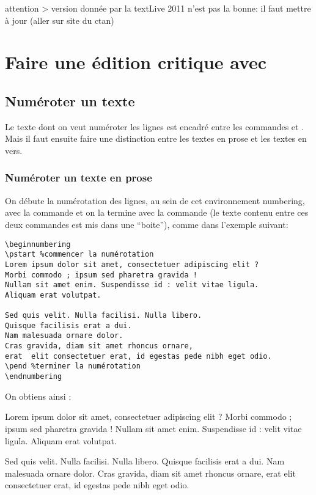 

attention > version donnée par la textLive 2011 n'est pas la bonne: il faut mettre à jour  (aller sur site du ctan)

\section{Faire une édition critique avec }

\subsection{Numéroter un texte}

Le texte dont on veut numéroter les lignes est encadré entre les commandes  et . Mais il faut ensuite faire une distinction entre les textes en prose et les textes en vers. 

\subsubsection{Numéroter un texte en prose}


On débute la numérotation des lignes, au sein de cet environnement numbering, avec la commande  et on la termine avec la commande  (le texte contenu entre ces deux commandes est mis dans une \enquote{boite}), comme dans l'exemple suivant:

\begin{verbatim}
\beginnumbering
\pstart %commencer la numérotation
Lorem ipsum dolor sit amet, consectetuer adipiscing elit ?
Morbi commodo ; ipsum sed pharetra gravida !
Nullam sit amet enim. Suspendisse id : velit vitae ligula.
Aliquam erat volutpat.

Sed quis velit. Nulla facilisi. Nulla libero. 
Quisque facilisis erat a dui. 
Nam malesuada ornare dolor.
Cras gravida, diam sit amet rhoncus ornare, 
erat  elit consectetuer erat, id egestas pede nibh eget odio.
\pend %terminer la numérotation
\endnumbering
\end{verbatim}

On obtiens ainsi : \bigbreak

\begin{minipage}{10cm}
\beginnumbering
\pstart %
Lorem ipsum dolor sit amet, consectetuer adipiscing elit ?
Morbi commodo ; ipsum sed pharetra gravida !
Nullam sit amet enim. Suspendisse id : velit vitae ligula. 
Aliquam erat volutpat.


Sed quis velit. Nulla facilisi. Nulla libero. 
 Quisque facilisis erat a dui. %
Nam malesuada ornare dolor.
Cras gravida, diam sit amet rhoncus ornare, 
erat  elit consectetuer erat, id egestas pede nibh eget odio.
\pend
\endnumbering
\end{minipage}
\bigbreak

